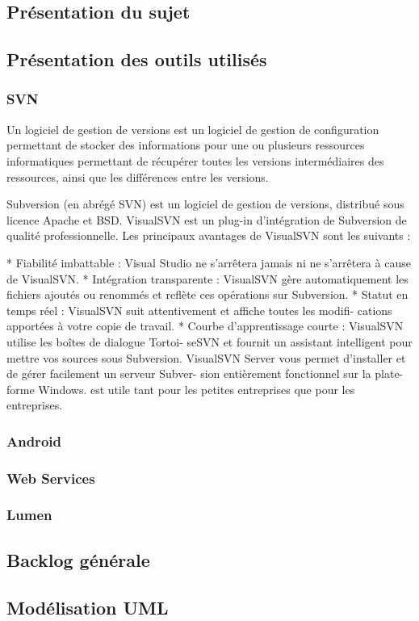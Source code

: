\subsection{Présentation du sujet}

\subsection{Présentation des outils utilisés}
\subsubsection{SVN}
Un logiciel de gestion de versions est un logiciel de gestion
de configuration permettant
de stocker des informations pour une ou plusieurs ressources
informatiques permettant de
récupérer toutes les versions intermédiaires des ressources,
ainsi que les différences entre
les versions.


Subversion (en abrégé SVN) est un logiciel de gestion de versions, distribué sous licence
Apache et BSD.
VisualSVN est un plug-in d’intégration de Subversion de qualité professionnelle. Les
principaux avantages de VisualSVN sont les suivants :

* Fiabilité imbattable : Visual Studio ne s’arrêtera jamais ni ne s’arrêtera à cause
de VisualSVN.
* Intégration transparente : VisualSVN gère automatiquement les fichiers ajoutés
ou renommés et reflète ces opérations sur Subversion.
* Statut en temps réel : VisualSVN suit attentivement et affiche toutes les modifi-
cations apportées à votre copie de travail.
* Courbe d’apprentissage courte : VisualSVN utilise les boîtes de dialogue Tortoi-
seSVN et fournit un assistant intelligent pour mettre vos sources sous Subversion.
VisualSVN Server vous permet d’installer et de gérer facilement un serveur Subver-
sion entièrement fonctionnel sur la plate-forme Windows. est utile tant pour les petites
entreprises que pour les entreprises.
\subsubsection{Android}

\subsubsection{Web Services}

\subsubsection{Lumen}

\subsection{Backlog générale}

\subsection{Modélisation UML}
